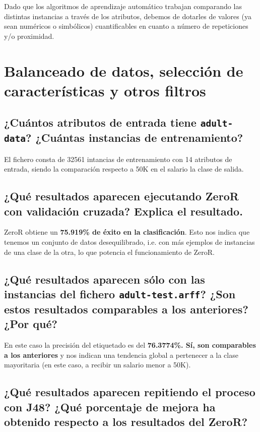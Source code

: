 \documentclass[12pt]{article}
\begin{document}
Dado que los algoritmos de aprendizaje automático trabajan comparando las distintas instancias a través de los atributos, debemos de dotarles de valores (ya sean numéricos o simbólicos) cuantificables en cuanto a número de repeticiones y/o proximidad.

\newpage

\section{Balanceado de datos, selección de características y otros filtros}

\subsection*{\small ¿Cuántos atributos de entrada tiene \texttt{adult-data}? ¿Cuántas instancias de entrenamiento?}

El fichero consta de 32561 intancias de entrenamiento con 14 atributos de entrada, siendo la comparación respecto a 50K en el salario la clase de salida.

\subsection*{\small ¿Qué resultados aparecen ejecutando ZeroR con validación cruzada? Explica el resultado.}

ZeroR obtiene un \textbf{75.919\% de éxito en la clasificación}. Esto nos indica que tenemos un conjunto de datos desequilibrado, i.e. con más ejemplos de instancias de una clase de la otra, lo que potencia el funcionamiento de ZeroR.

\subsection*{\small ¿Qué resultados aparecen sólo con las instancias del fichero \texttt{adult-test.arff}? ¿Son estos resultados comparables a los anteriores? ¿Por qué?}

En este caso la precisión del etiquetado es del \textbf{76.3774\%. Sí, son comparables a los anteriores} y nos indican una tendencia global a pertenecer a la clase mayoritaria (en este caso, a recibir un salario menor a 50K).

\subsection*{\small ¿Qué resultados aparecen repitiendo el proceso con J48? ¿Qué porcentaje de mejora ha obtenido respecto a los resultados del ZeroR?}
\end{document}

